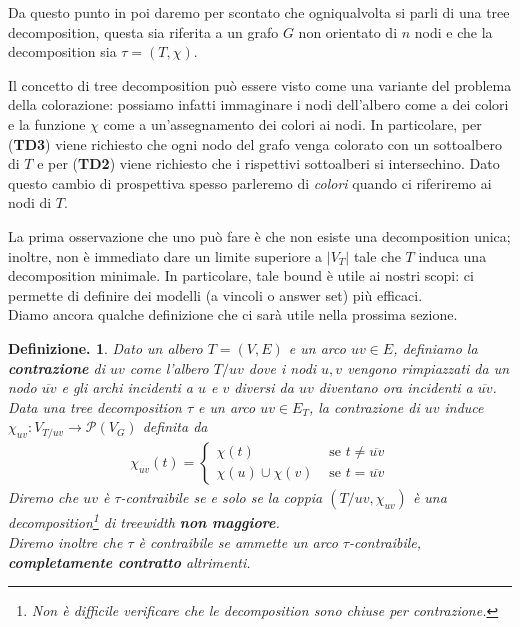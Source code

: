 \documentclass{report}
\newtheorem{defi}{Definizione.}
\begin{document}
Da questo punto in poi daremo per scontato che ogniqualvolta si parli di una tree decomposition, questa sia riferita a un grafo $G$ non orientato di $n$ nodi
e che la decomposition sia $\tau = (T, \chi)$.

Il concetto di tree decomposition può essere visto come una variante del problema della colorazione: possiamo infatti immaginare i nodi dell'albero
come a dei colori e la funzione $\chi$ come a un'assegnamento dei colori ai nodi. In particolare, per (\textbf{TD3}) viene richiesto che ogni nodo del grafo
venga colorato con un sottoalbero di $T$ e per (\textbf{TD2}) viene richiesto che i rispettivi sottoalberi si intersechino. Dato questo cambio di prospettiva spesso
parleremo di \textit{colori} quando ci riferiremo ai nodi di $T$.

La prima osservazione che uno può fare è che non esiste una decomposition unica; inoltre, non è immediato dare un limite superiore a $|V_T|$ tale che
$T$ induca una decomposition minimale. In particolare, tale bound è utile ai nostri scopi: ci permette di definire dei modelli (a vincoli o answer set) più efficaci.
\ \\

Diamo ancora qualche definizione che ci sarà utile nella prossima sezione.
\begin{defi}
Dato un albero $T = (V, E)$ e un arco $uv \in E$, definiamo la \textbf{contrazione} di $uv$ come l'albero $T/uv$ dove i nodi $u, v$ vengono rimpiazzati da un nodo
$\overline{uv}$ e gli archi incidenti a $u$ e $v$ diversi da $uv$ diventano ora incidenti a $\overline{uv}$.
Data una tree decomposition $\tau$ e un arco $uv \in E_T$, la contrazione di $uv$ induce $\chi_{uv}: V_{T/uv} \longrightarrow \mathscr{P}(V_G)$ definita da
\begin{align*}
\chi_{uv}(t) = \begin{cases}
										\chi(t) 							 & \text{ se } t \neq \overline{uv}\\
										\chi(u) \cup \chi(v)  & \text{ se } t = \overline{uv}
							  \end{cases}
\end{align*}
Diremo che $uv$ è $\tau$\textit{-contraibile} se e solo se la coppia $(T/uv, \chi_{uv})$ è una decomposition\footnote{Non è difficile verificare che le decomposition
sono chiuse per contrazione.} di treewidth \textbf{non maggiore}.\\
Diremo inoltre che $\tau$ è contraibile se ammette un arco $\tau$-contraibile, \textbf{completamente contratto} altrimenti.
\end{defi}
\end{document}
